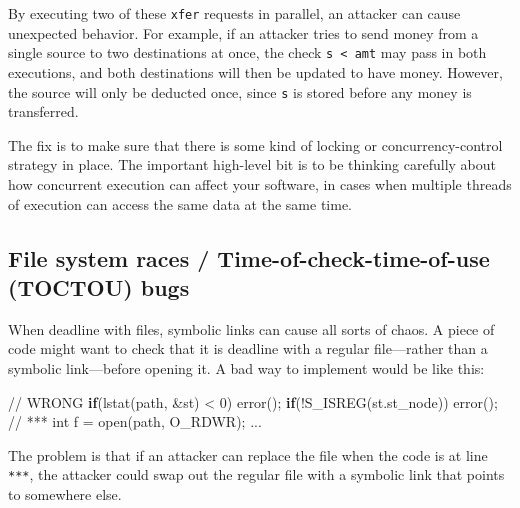 \documentclass[
  letterpaper,
]{scrbook}
\newenvironment{Shaded}{\begin{snugshade}}{\end{snugshade}}
\newcommand{\CommentTok}[1]{\textcolor[rgb]{0.37,0.37,0.37}{#1}}
\newcommand{\ControlFlowTok}[1]{\textcolor[rgb]{0.00,0.23,0.31}{\textbf{#1}}}
\newcommand{\DataTypeTok}[1]{\textcolor[rgb]{0.68,0.00,0.00}{#1}}
\newcommand{\DecValTok}[1]{\textcolor[rgb]{0.68,0.00,0.00}{#1}}
\newcommand{\NormalTok}[1]{\textcolor[rgb]{0.00,0.23,0.31}{#1}}
\newcommand{\OperatorTok}[1]{\textcolor[rgb]{0.37,0.37,0.37}{#1}}
\theoremstyle{definition}
\theoremstyle{plain}
\theoremstyle{plain}
\theoremstyle{remark}
\begin{document}
By executing two of these \texttt{xfer} requests in parallel, an
attacker can cause unexpected behavior. For example, if an attacker
tries to send money from a single source to two destinations at once,
the check \texttt{s\ \textless{}\ amt} may pass in both executions, and
both destinations will then be updated to have money. However, the
source will only be deducted once, since \texttt{s} is stored before any
money is transferred.

The fix is to make sure that there is some kind of locking or
concurrency-control strategy in place. The important high-level bit is
to be thinking carefully about how concurrent execution can affect your
software, in cases when multiple threads of execution can access the
same data at the same time.

\subsection{File system races / Time-of-check-time-of-use (TOCTOU)
bugs}\label{file-system-races-time-of-check-time-of-use-toctou-bugs}

When deadline with files, symbolic links can cause all sorts of chaos. A
piece of code might want to check that it is deadline with a regular
file---rather than a symbolic link---before opening it. A bad way to
implement would be like this:

\begin{Shaded}
\begin{Highlighting}[]
\CommentTok{// WRONG}
\ControlFlowTok{if}\OperatorTok{(}\NormalTok{lstat}\OperatorTok{(}\NormalTok{path}\OperatorTok{,} \OperatorTok{\&}\NormalTok{st}\OperatorTok{)} \OperatorTok{\textless{}} \DecValTok{0}\OperatorTok{)}\NormalTok{ error}\OperatorTok{();}
\ControlFlowTok{if}\OperatorTok{(!}\NormalTok{S\_ISREG}\OperatorTok{(}\NormalTok{st}\OperatorTok{.}\NormalTok{st\_node}\OperatorTok{))}\NormalTok{ error}\OperatorTok{();}
\CommentTok{// ***}
\DataTypeTok{int}\NormalTok{ f }\OperatorTok{=}\NormalTok{ open}\OperatorTok{(}\NormalTok{path}\OperatorTok{,}\NormalTok{ O\_RDWR}\OperatorTok{);}
\OperatorTok{...}
\end{Highlighting}
\end{Shaded}

The problem is that if an attacker can replace the file when the code is
at line \texttt{***}, the attacker could swap out the regular file with
a symbolic link that points to somewhere else.

\end{document}
